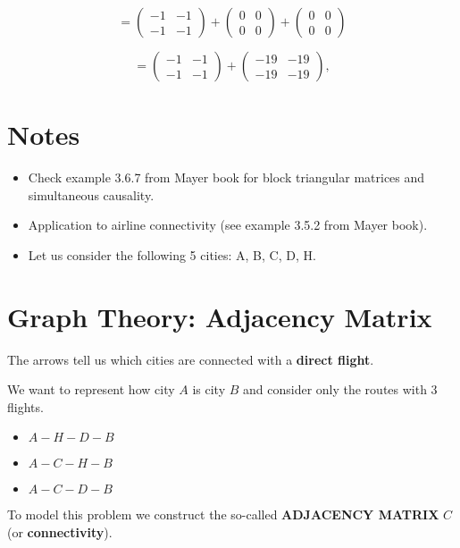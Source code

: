 \[
= \begin{pmatrix}
-1 & -1 \\
-1 & -1
\end{pmatrix}
+ \begin{pmatrix}
0 & 0 \\
0 & 0
\end{pmatrix}
+ \begin{pmatrix}
0 & 0 \\
0 & 0
\end{pmatrix}
\]

\[
= \begin{pmatrix}
-1 & -1 \\
-1 & -1
\end{pmatrix}
+ \begin{pmatrix}
-19 & -19 \\
-19 & -19
\end{pmatrix},
\]

\section*{Notes}
\begin{itemize}
\item Check example 3.6.7 from Mayer book for block triangular matrices and simultaneous causality.
\item Application to airline connectivity (see example 3.5.2 from Mayer book).
\item Let us consider the following 5 cities: A, B, C, D, H.
\end{itemize}

\section{Graph Theory: Adjacency Matrix}
\author{Anonymous}



The arrows tell us which cities are connected with a \textbf{direct flight}.

We want to represent how city $A$ is city $B$ and consider only the routes with 3 flights.

\begin{itemize}
    \item $A - H - D - B$
    \item $A - C - H - B$
    \item $A - C - D - B$
\end{itemize}

To model this problem we construct the so-called \textbf{ADJACENCY MATRIX} $C$ (or \textbf{connectivity}).

